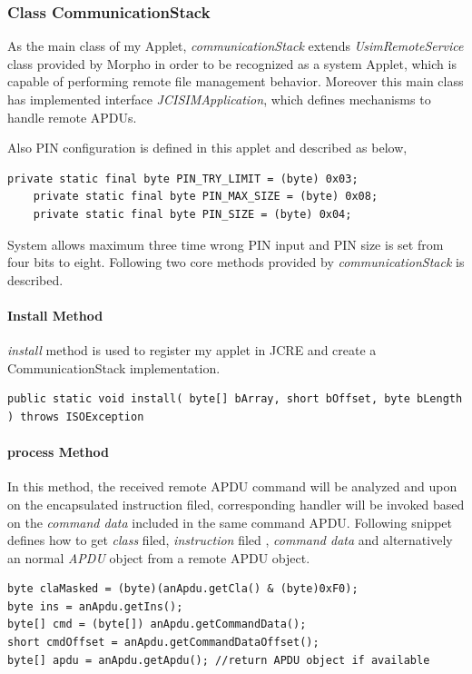 \subsubsection{Class CommunicationStack} \sloppy
As the main class of my Applet, \emph{communicationStack} extends \emph{UsimRemoteService} class provided by Morpho in order to be recognized as a system Applet, which is capable of performing remote file management behavior. Moreover this main class has implemented interface \emph{JCISIMApplication}, which defines mechanisms to handle remote APDUs.

Also PIN configuration is defined in this applet and described as below, 

\begin{Verbatim}[fontsize=\relsize{-1}]
    private static final byte PIN_TRY_LIMIT = (byte) 0x03;
    private static final byte PIN_MAX_SIZE = (byte) 0x08;
    private static final byte PIN_SIZE = (byte) 0x04;
\end{Verbatim}

System allows maximum three time wrong PIN input and PIN size is set from four bits to eight.
Following two core methods provided by \emph{communicationStack} is described.
\paragraph{Install Method}
\emph{install} method is used to register my applet in JCRE and create a CommunicationStack implementation.
\begin{Verbatim}[fontsize=\relsize{-1.5}, frame=lines,framesep=4mm, label=\fbox{\small\emph{doVerifyPIN Handler}}]
public static void install( byte[] bArray, short bOffset, byte bLength ) throws ISOException
\end{Verbatim}

\paragraph{process Method} \label{secDummy}
In this method, the received remote APDU command will be analyzed and upon on the encapsulated instruction filed, corresponding handler will be invoked based on the \emph{command data} included in the same command APDU. Following snippet defines how to get \emph{class} filed, \emph{instruction} filed , \emph{command data} and alternatively an normal \emph{APDU} object from a remote APDU object.


\begin{Verbatim}[frame=lines,framesep=4mm, label=\fbox{\small\emph{Remote APDU Operation}}]
byte claMasked = (byte)(anApdu.getCla() & (byte)0xF0);
byte ins = anApdu.getIns();
byte[] cmd = (byte[]) anApdu.getCommandData();	    
short cmdOffset = anApdu.getCommandDataOffset();
byte[] apdu = anApdu.getApdu(); //return APDU object if available
\end{Verbatim}


